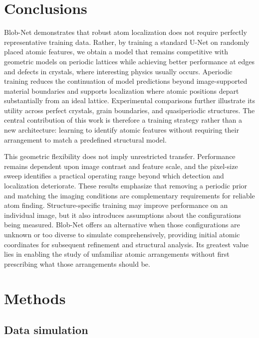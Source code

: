\section{Conclusions}

Blob-Net demonstrates that robust atom localization does not require perfectly representative training data. Rather, by training a standard U-Net on randomly placed atomic features, we obtain a model that remains competitive with geometric models on periodic lattices while achieving better performance at edges and defects in crystals, where interesting physics usually occurs. Aperiodic training reduces the continuation of model predictions beyond image-supported material boundaries and supports localization where atomic positions depart substantially from an ideal lattice. Experimental comparisons further illustrate its utility across perfect crystals, grain boundaries, and quasiperiodic structures. The central contribution of this work is therefore a training strategy rather than a new architecture: learning to identify atomic features without requiring their arrangement to match a predefined structural model.

This geometric flexibility does not imply unrestricted transfer. Performance remains dependent upon image contrast and feature scale, and the pixel-size sweep identifies a practical operating range beyond which detection and localization deteriorate. These results emphasize that removing a periodic prior and matching the imaging conditions are complementary requirements for reliable atom finding. Structure-specific training may improve performance on an individual image, but it also introduces assumptions about the configurations being measured. Blob-Net offers an alternative when those configurations are unknown or too diverse to simulate comprehensively, providing initial atomic coordinates for subsequent refinement and structural analysis. Its greatest value lies in enabling the study of unfamiliar atomic arrangements without first prescribing what those arrangements should be.

\section{Methods}

\subsection{Data simulation}

